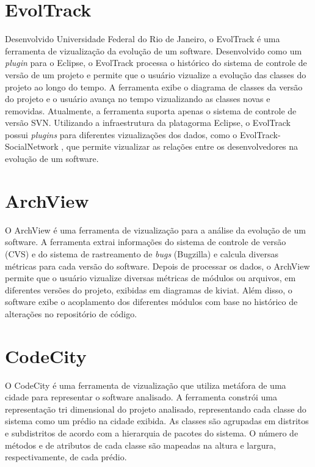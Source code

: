 \documentclass[a4paper, 12pt, twoside]{book}
\begin{document}
\section{EvolTrack}
    Desenvolvido Universidade Federal do Rio de Janeiro, o EvolTrack é uma ferramenta de vizualização da evolução de um software. Desenvolvido como um \textit{plugin} para o Eclipse, o EvolTrack processa o histórico do sistema de controle de versão de um projeto e permite que o usuário vizualize a evolução das classes do projeto ao longo do tempo. A ferramenta exibe o diagrama de classes da versão do projeto e o usuário avança no tempo vizualizando as classes novas e removidas. Atualmente, a ferramenta suporta apenas o sistema de controle de versão SVN. Utilizando a infraestrutura da platagorma Eclipse, o EvolTrack possui \textit{plugins} para diferentes vizualizações dos dados, como o EvolTrack-SocialNetwork \cite{vahia:11}, que permite vizualizar as relações entre os desenvolvedores na evolução de um software.

\section{ArchView}
    O ArchView \cite{pinzger:05} é uma ferramenta de vizualização para a análise da evolução de um software. A ferramenta extrai informações do sistema de controle de versão (CVS) e do sistema de rastreamento de \textit{bugs} (Bugzilla) e calcula diversas métricas para cada versão do software. Depois de processar os dados, o ArchView permite que o usuário vizualize diversas métricas de módulos ou arquivos, em diferentes versões do projeto, exibidas em diagramas de kiviat. Além disso, o software exibe o acoplamento dos diferentes módulos com base no histórico de alterações no repositório de código.

\section{CodeCity}
    O CodeCity \cite{wettel07} é uma ferramenta de vizualização que utiliza metáfora de uma cidade para representar o software analisado. A ferramenta constrói uma representação tri dimensional do projeto analisado, representando cada classe do sistema como um prédio na cidade exibida. As classes são agrupadas em distritos e subdistritos de acordo com a hierarquia de pacotes do sistema. O número de métodos e de atributos de cada classe são mapeadas na altura e largura, respectivamente, de cada prédio.
    
\end{document}
